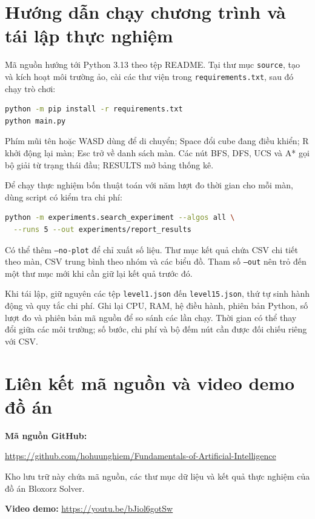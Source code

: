 \section{Hướng dẫn chạy chương trình và tái lập thực nghiệm}
Mã nguồn hướng tới Python 3.13 theo tệp README. Tại thư mục \texttt{source}, tạo và kích hoạt môi trường ảo, cài các thư viện trong \texttt{requirements.txt}, sau đó chạy trò chơi:
\begin{lstlisting}[language=bash,numbers=none]
python -m pip install -r requirements.txt
python main.py
\end{lstlisting}
Phím mũi tên hoặc WASD dùng để di chuyển; Space đổi cube đang điều khiển; R khởi động lại màn; Esc trở về danh sách màn. Các nút BFS, DFS, UCS và A* gọi bộ giải từ trạng thái đầu; RESULTS mở bảng thống kê.

Để chạy thực nghiệm bốn thuật toán với năm lượt đo thời gian cho mỗi màn, dùng script có kiểm tra chi phí:
\begin{lstlisting}[language=bash,numbers=none]
python -m experiments.search_experiment --algos all \
  --runs 5 --out experiments/report_results
\end{lstlisting}
Có thể thêm \texttt{--no-plot} để chỉ xuất số liệu. Thư mục kết quả chứa CSV chi tiết theo màn, CSV trung bình theo nhóm và các biểu đồ. Tham số \texttt{--out} nên trỏ đến một thư mục mới khi cần giữ lại kết quả trước đó.

Khi tái lập, giữ nguyên các tệp \texttt{level1.json} đến \texttt{level15.json}, thứ tự sinh hành động và quy tắc chi phí. Ghi lại CPU, RAM, hệ điều hành, phiên bản Python, số lượt đo và phiên bản mã nguồn để so sánh các lần chạy. Thời gian có thể thay đổi giữa các môi trường; số bước, chi phí và bộ đếm nút cần được đối chiếu riêng với CSV.

\clearpage
\section{Liên kết mã nguồn và video demo đồ án}

\noindent\textbf{Mã nguồn GitHub:}\par
\noindent\url{https://github.com/hohuunghiem/Fundamentals-of-Artificial-Intelligence}

\noindent Kho lưu trữ này chứa mã nguồn, các thư mục dữ liệu và kết quả thực nghiệm của đồ án Bloxorz Solver.

\vspace{5mm}
\noindent\textbf{Video demo:} \url{https://youtu.be/bJiol6gotSw}
